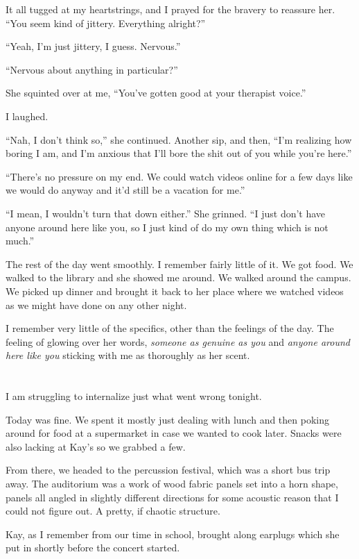 It all tugged at my heartstrings, and I prayed for the bravery to reassure her. ``You seem kind of jittery. Everything alright?''

``Yeah, I'm just jittery, I guess. Nervous.''

``Nervous about anything in particular?''

She squinted over at me, ``You've gotten good at your therapist voice.''

I laughed.

``Nah, I don't think so,'' she continued. Another sip, and then, ``I'm realizing how boring I am, and I'm anxious that I'll bore the shit out of you while you're here.''

``There's no pressure on my end. We could watch videos online for a few days like we would do anyway and it'd still be a vacation for me.''

``I mean, I wouldn't turn that down either.'' She grinned. ``I just don't have anyone around here like you, so I just kind of do my own thing which is not much.''

The rest of the day went smoothly. I remember fairly little of it. We got food. We walked to the library and she showed me around. We walked around the campus. We picked up dinner and brought it back to her place where we watched videos as we might have done on any other night.

I remember very little of the specifics, other than the feelings of the day. The feeling of glowing over her words, \emph{someone as genuine as you} and \emph{anyone around here like you} sticking with me as thoroughly as her scent.

\section{}

I am struggling to internalize just what went wrong tonight.

Today was fine. We spent it mostly just dealing with lunch and then poking around for food at a supermarket in case we wanted to cook later. Snacks were also lacking at Kay's so we grabbed a few.

From there, we headed to the percussion festival, which was a short bus trip away. The auditorium was a work of wood fabric panels set into a horn shape, panels all angled in slightly different directions for some acoustic reason that I could not figure out. A pretty, if chaotic structure.

Kay, as I remember from our time in school, brought along earplugs which she put in shortly before the concert started.

